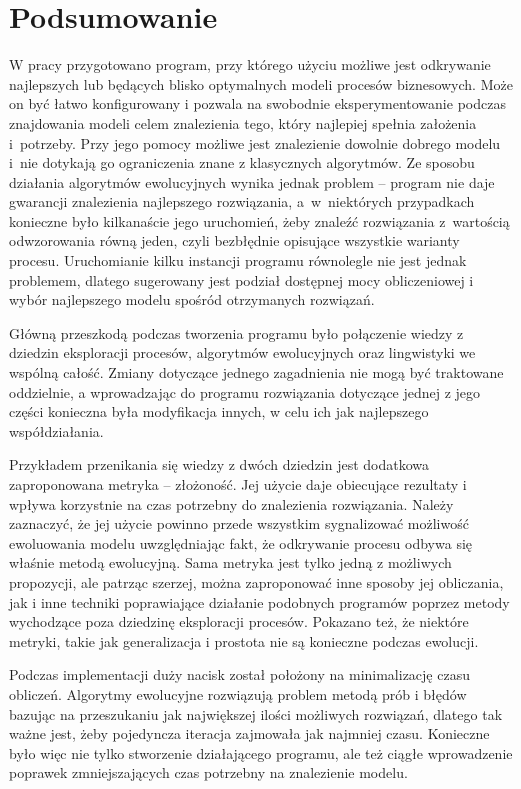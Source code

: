 \chapter{Podsumowanie}

W pracy przygotowano program, przy którego użyciu możliwe jest odkrywanie najlepszych lub będących blisko optymalnych modeli procesów biznesowych. Może on być łatwo konfigurowany i pozwala na swobodnie eksperymentowanie podczas znajdowania modeli celem znalezienia tego, który najlepiej spełnia założenia i~potrzeby. Przy jego pomocy możliwe jest znalezienie dowolnie dobrego modelu i~nie dotykają go ograniczenia znane z klasycznych algorytmów. Ze sposobu działania algorytmów ewolucyjnych wynika jednak problem -- program nie daje gwarancji znalezienia najlepszego rozwiązania, a~w~niektórych przypadkach konieczne było kilkanaście jego uruchomień, żeby znaleźć rozwiązania z~wartością odwzorowania równą jeden, czyli bezbłędnie opisujące wszystkie warianty procesu. Uruchomianie kilku instancji programu równolegle nie jest jednak problemem, dlatego sugerowany jest podział dostępnej mocy obliczeniowej i wybór najlepszego modelu spośród otrzymanych rozwiązań. 

Główną przeszkodą podczas tworzenia programu było połączenie wiedzy z dziedzin eksploracji procesów, algorytmów ewolucyjnych oraz lingwistyki we wspólną całość. Zmiany dotyczące jednego zagadnienia nie mogą być traktowane oddzielnie, a wprowadzając do programu rozwiązania dotyczące jednej z jego części konieczna była modyfikacja innych, w celu ich jak najlepszego współdziałania.

Przykładem przenikania się wiedzy z dwóch dziedzin jest dodatkowa zaproponowana metryka -- złożoność. Jej użycie daje obiecujące rezultaty i wpływa korzystnie na czas potrzebny do znalezienia rozwiązania. Należy zaznaczyć, że jej użycie powinno przede wszystkim sygnalizować możliwość ewoluowania modelu uwzględniając fakt, że odkrywanie procesu odbywa się właśnie metodą ewolucyjną. Sama metryka jest tylko jedną z możliwych propozycji, ale patrząc szerzej, można zaproponować inne sposoby jej obliczania, jak i inne techniki poprawiające działanie podobnych programów poprzez metody wychodzące poza dziedzinę eksploracji procesów. Pokazano też, że niektóre metryki, takie jak generalizacja i prostota nie są konieczne podczas ewolucji.

Podczas implementacji duży nacisk został położony na minimalizację czasu obliczeń. Algorytmy ewolucyjne rozwiązują problem metodą prób i błędów bazując na przeszukaniu jak największej ilości możliwych rozwiązań, dlatego tak ważne jest, żeby pojedyncza iteracja zajmowała jak najmniej czasu. Konieczne było więc nie tylko stworzenie działającego programu, ale też ciągłe wprowadzenie poprawek zmniejszających czas potrzebny na znalezienie modelu.

